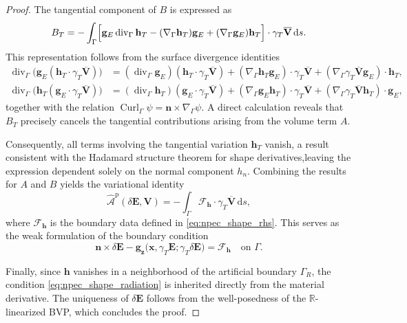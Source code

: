 \documentclass[12pt,reqno]{amsart}
\theoremstyle{definition}
\numberwithin{equation}{section}
\begin{document}
\begin{proof}
The tangential component of $B$ is expressed as
\begin{equation*}
B_T = -\int_\Gamma \Bigl[ \mathbf{g}_E \operatorname{div}_\Gamma\mathbf{h}_T - (\nabla_\Gamma\mathbf{h}_T)\mathbf{g}_E + (\nabla_\Gamma\mathbf{g}_E)\mathbf{h}_T \Bigr] \cdot \gamma_T\overline{\mathbf{V}} \, \mathrm{d}s.
\end{equation*}
This representation follows from the surface divergence identities
\begin{equation*}
\begin{aligned}
\operatorname{div}_\Gamma \bigl(\mathbf{g}_E(\mathbf{h}_T \cdot \gamma_T\overline{\mathbf{V}})\bigr) &= (\operatorname{div}_\Gamma\mathbf{g}_E) (\mathbf{h}_T \cdot \gamma_T\overline{\mathbf{V}}) + (\nabla_\Gamma{\mathbf{h}_T}\mathbf{g}_E) \cdot \gamma_T\overline{\mathbf{V}} + (\nabla_\Gamma{{\gamma_T\overline{\mathbf{V}}}}\mathbf{g}_E) \cdot \mathbf{h}_T, \\
\operatorname{div}_\Gamma \bigl(\mathbf{h}_T(\mathbf{g}_E \cdot \gamma_T\overline{\mathbf{V}})\bigr) &= (\operatorname{div}_\Gamma\mathbf{h}_T) (\mathbf{g}_E \cdot \gamma_T\overline{\mathbf{V}}) + (\nabla_\Gamma{\mathbf{g}_E}\mathbf{h}_T) \cdot \gamma_T\overline{\mathbf{V}} + (\nabla_\Gamma{\gamma_T\overline{\mathbf{V}}}\mathbf{h}_T) \cdot \mathbf{g}_E,
\end{aligned}
\end{equation*}
together with the relation $\operatorname{Curl}_\Gamma \psi = \mathbf{n} \times \nabla_\Gamma \psi$. A direct calculation reveals that $B_T$ precisely cancels the tangential contributions arising from the volume term $A$.

Consequently, all terms involving the tangential variation $\mathbf{h}_T$ vanish, a result consistent with the Hadamard structure theorem for shape derivatives,leaving the expression dependent solely on the normal component $h_n$. Combining the results for $A$ and $B$ yields the variational identity
\begin{equation*}
\widehat{\mathcal{A}}^{\mathrm{p}}(\delta\mathbf{E}, \mathbf{V}) = -\int_\Gamma \mathcal{F}_{\mathbf{h}} \cdot \gamma_T\overline{\mathbf{V}} \, \mathrm{d}s,
\end{equation*}
where $\mathcal{F}_{\mathbf{h}}$ is the boundary data defined in \eqref{eq:npec_shape_rhs}. This serves as the weak formulation of the boundary condition 
\begin{equation*}
\mathbf{n} \times \delta\mathbf{E} - \mathbf{g}_{\boldsymbol{z}} \bigl( \boldsymbol{x}, \gamma_T\mathbf{E}; \gamma_T\delta\mathbf{E} \bigr) = \mathcal{F}_{\mathbf{h}} \quad \text{on } \Gamma.
\end{equation*}

Finally, since $\mathbf{h}$ vanishes in a neighborhood of the artificial boundary $\Gamma_R$, the condition \eqref{eq:npec_shape_radiation} is inherited directly from the material derivative. The uniqueness of $\delta\mathbf{E}$ follows from the well-posedness of the $\mathbb{R}$-linearized BVP, which concludes the proof.



\end{proof}
\end{document}
